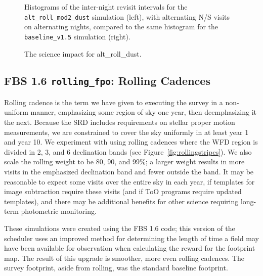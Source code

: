 \begin{figure}
\caption{Histograms of the inter-night revisit intervals for the {\tt alt\_roll\_mod2\_dust} simulation (left), with alternating N/S visits on alternating nights, compared to the same histogram for the {\tt baseline\_v1.5} simulation (right).}
\label{fig:alt_internight}
\end{figure}

\begin{figure}
\caption{The science impact for alt\_roll\_dust.}\label{fig:alt_radar}
\end{figure}

\subsection{FBS 1.6 {\tt rolling\_fpo}: Rolling Cadences}\label{ss:rolling}

Rolling cadence is the term we have given to executing the survey in a non-uniform manner, emphasizing some region of sky one year, then deemphasizing it the next.  Because the SRD includes requirements on stellar proper motion measurements, we are constrained to cover the sky uniformly in at least year 1 and year 10.  We experiment with using rolling cadences where the WFD region is divided in 2, 3, and 6 declination bands (see Figure~\ref{fig:rollingstripes}). We also scale the rolling weight to be 80, 90, and 99\%; a larger weight results in more visits in the emphasized declination band and fewer outside the band. It may be reasonable to expect some visits over the entire sky in each year, if templates for image subtraction require these visits (and if ToO programs require updated templates), and there may be additional benefits for other science requiring long-term photometric monitoring. 

These simulations were created using the FBS 1.6 code; this version of the scheduler uses an improved method for determining the length of time a field may have been available for observation when calculating the reward for the footprint map. The result of this upgrade is smoother, more even rolling cadences. The survey footprint, aside from rolling, was the standard baseline footprint.

